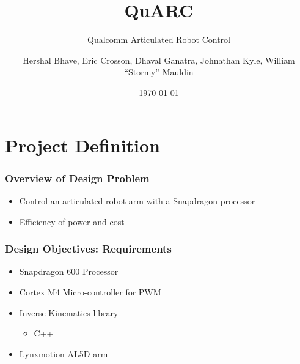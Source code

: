 \documentclass[10pt, compress]{beamer}
\title{QuARC}
\subtitle{Qualcomm Articulated Robot Control}
\date{\today}
\author{Hershal Bhave, Eric Crosson, Dhaval Ganatra, Johnathan Kyle, William
  ``Stormy'' Mauldin}
\institute{University of Texas}
\begin{document}
\maketitle

\section{Project Definition}

\begin{frame}[fragile]
  \frametitle{Overview of Design Problem}

  \begin{itemize}
  \item Control an articulated robot arm with a Snapdragon processor
  \item Efficiency of power and cost
  \end{itemize}
\end{frame}

\begin{frame}[fragile]
  \frametitle{Design Objectives: Requirements}
  \begin{itemize}
    \item Snapdragon 600 Processor
    \item Cortex M4 Micro-controller for PWM
    \item Inverse Kinematics library
      \begin{itemize}[label=$\circ$]
        \item C++
      \end{itemize}
    \item Lynxmotion AL5D arm
  \end{itemize}
\end{frame}
\end{document}
